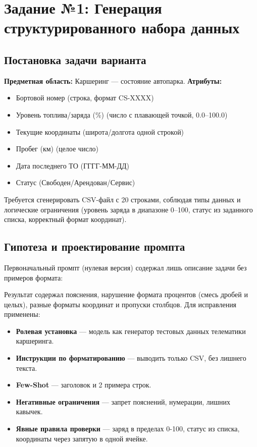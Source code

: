 \documentclass[oneside,a4paper,14pt]{extarticle} %
\begin{document}
	\section{Задание №1: Генерация структурированного набора данных}
	\subsection{Постановка задачи варианта}
	\noindent
	\textbf{Предметная область:} Каршеринг --- состояние автопарка.
	\noindent
	\textbf{Атрибуты:}
	\begin{itemize}
		\item Бортовой номер (строка, формат CS-XXXX)
		\item Уровень топлива/заряда (\%) (число с плавающей точкой, 0.0--100.0)
		\item Текущие координаты (широта/долгота одной строкой)
		\item Пробег (км) (целое число)
		\item Дата последнего ТО (ГГГГ-ММ-ДД)
		\item Статус (Свободен/Арендован/Сервис)
	\end{itemize}
	\noindent
	Требуется сгенерировать CSV-файл с 20 строками, соблюдая типы данных и логические ограничения (уровень заряда в диапазоне 0--100, статус из заданного списка, корректный формат координат).
	\subsection{Гипотеза и проектирование промпта}
	\noindent
	Первоначальный промпт (нулевая версия) содержал лишь описание задачи без примеров формата:
	
	\newpage
	\noindent
	Результат содержал пояснения, нарушение формата процентов (смесь дробей и целых), разные форматы координат и пропуски столбцов. Для исправления применены:
	\begin{itemize}
		\item \textbf{Ролевая установка} --- модель как генератор тестовых данных телематики каршеринга.
		\item \textbf{Инструкции по форматированию} --- выводить только CSV, без лишнего текста.
		\item \textbf{Few-Shot} --- заголовок и 2 примера строк.
		\item \textbf{Негативные ограничения} --- запрет пояснений, нумерации, лишних кавычек.
		\item \textbf{Явные правила проверки} --- заряд в пределах 0-100, статус из списка, координаты через запятую в одной ячейке.
	\end{itemize}
\end{document}
